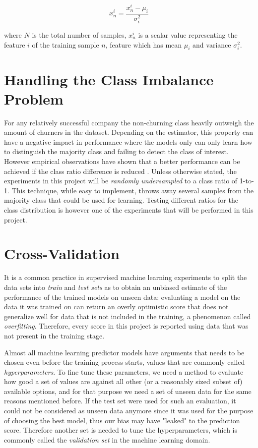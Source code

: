 \documentclass{kththesis}
\begin{document}
\begin{equation}
x_n^i = \frac{x_n^i - \mu_i}{\sigma_i^2}
\end{equation}

where $N$ is the total number of samples, $x_n^i$ is a scalar value representing the feature $i$ of the training sample $n$, feature which has mean $\mu_i$ and variance $\sigma^2_i$.

\section{Handling the Class Imbalance Problem}

For any relatively successful company the non-churning class heavily outweigh the amount of churners in the dataset. Depending on the estimator, this property can have a negative impact in performance where the models only can only learn how to distinguish the majority class and failing to detect the class of interest. However empirical observations have shown that a better performance can be achieved if the class ratio difference is reduced \citep{Burez2009} \citep{ling1998data}. Unless otherwise stated, the experiments in this project will be \emph{randomly undersampled} to a class ratio of 1-to-1. This technique, while easy to implement, throws away several samples from the majority class that could be used for learning. Testing different ratios for the class distribution is however one of the experiments that will be performed in this project.

\section{Cross-Validation}

It is a common  practice in supervised machine learning experiments to split the data sets into \emph{train} and \emph{test sets} as to obtain an unbiased estimate of the performance of the trained models on unseen data: evaluating a model on the data it was trained on can return an overly optimistic score that does not generalize well for data that is not included in the training, a phenomenon called \emph{overfitting}. Therefore, every score in this project is reported using data that was not present in the training stage.

Almost all machine learning predictor models have arguments that needs to be chosen even before the training process starts, values that are commonly called \emph{hyperparameters}. To fine tune these parameters, we need a method to evaluate how good a set of values are against all other (or a reasonably sized subset of) available options, and for that purpose we need a set of unseen data for the same reasons mentioned before. If the test set were used for such an evaluation, it could not be considered as unseen data anymore since it was used for the purpose of choosing the best model, thus our bias may have "leaked" to the prediction score. Therefore another set is needed to tune the hyperparameters, which is commonly called the \emph{validation set} in the machine learning domain.
\end{document}

